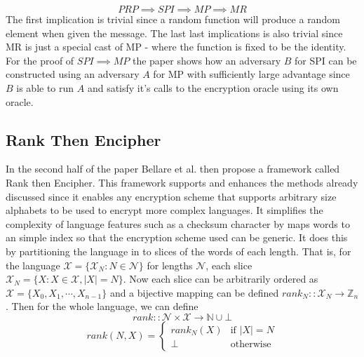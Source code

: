\documentclass[12pt,a4paper]{article}
\begin{document}
$$ PRP \implies SPI \implies MP \implies MR $$
The first implication is trivial since a random function will produce a random element when given the message. The last last implications is also trivial since MR is just a special cast of MP - where the function is fixed to be the identity. For the proof of $ SPI \implies MP $ the paper shows how an adversary $B$ for SPI can be  constructed using an adversary $A$ for MP with sufficiently large advantage since $B$ is able to run $A$ and satisfy it's calls to the encryption oracle using its own oracle.
\subsection{Rank Then Encipher}
In the second half of the paper\cite{fpe} Bellare et al. then propose a framework called Rank then Encipher. This framework supports and enhances the methods already discussed since it enables any encryption scheme that supports arbitrary size alphabets to be used to encrypt more complex languages. It simplifies the complexity of language features such as a checksum character by maps words to an simple index so that the encryption scheme used can be generic. It does this by partitioning the language in to slices of the words of each length. That is, for the language $\mathcal{X} = \{\mathcal{X}_N : N \in \mathcal{N} \}$ for lengths $\mathcal{N}$, each slice $\mathcal{X}_N = \{ X : X \in \mathcal{X}, \vert X \vert = N  \}$. Now each slice can be arbitrarily ordered as $\mathcal{X} = \{ X_0, X_1, \cdots , X_{n-1} \} $ and a bijective mapping can be defined $rank_N :: \mathcal{X}_N \rightarrow \mathbb{Z}_n$.
Then for the whole language, we can define
$$ rank :: \mathcal{N} \times \mathcal{X} \rightarrow \mathbb{N} \cup \bot $$
$$ rank(N,X) =
\left\{
	\begin{array}{ll}
		rank_N(X)  & \mbox{if } \vert X \vert = N\\
		\bot & \mbox{otherwise} 
	\end{array}
\right.
$$
\end{document}
